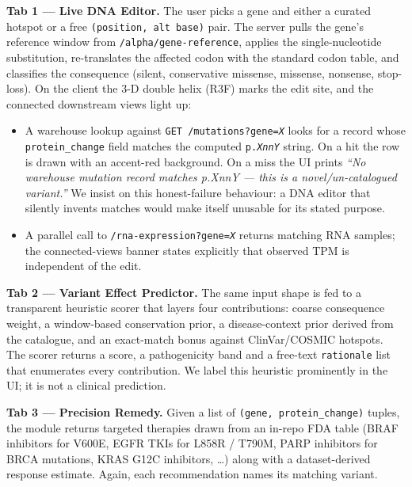 \documentclass[conference,10pt]{IEEEtran}
\begin{document}
\textbf{Tab 1 --- Live DNA Editor.} The user picks a gene and either a
curated hotspot or a free \texttt{(position, alt base)} pair. The server
pulls the gene's reference window from \texttt{/alpha/gene-reference},
applies the single-nucleotide substitution, re-translates the affected
codon with the standard codon table, and classifies the consequence
(silent, conservative missense, missense, nonsense, stop-loss). On the
client the 3-D double helix (R3F) marks the edit site, and the connected
downstream views light up:

\begin{itemize}
  \item A warehouse lookup against \texttt{GET /mutations?gene=\textit{X}}
        looks for a record whose \texttt{protein\_change} field matches
        the computed \texttt{p.\textit{XnnY}} string. On a hit the row
        is drawn with an accent-red background. On a miss the UI prints
        \textit{``No warehouse mutation record matches
        p.\textit{XnnY} --- this is a novel/un-catalogued
        variant.''} We insist on this honest-failure behaviour: a DNA
        editor that silently invents matches would make itself unusable
        for its stated purpose.
  \item A parallel call to \texttt{/rna-expression?gene=\textit{X}}
        returns matching RNA samples; the connected-views banner states
        explicitly that observed TPM is independent of the edit.
\end{itemize}

\textbf{Tab 2 --- Variant Effect Predictor.} The same input shape is fed
to a transparent heuristic scorer that layers four contributions:
coarse consequence weight, a window-based conservation prior, a
disease-context prior derived from the catalogue, and an exact-match
bonus against ClinVar/COSMIC hotspots. The scorer returns a score, a
pathogenicity band and a free-text \texttt{rationale} list that
enumerates every contribution. We label this heuristic prominently in
the UI; it is not a clinical prediction.

\textbf{Tab 3 --- Precision Remedy.} Given a list of
\texttt{(gene, protein\_change)} tuples, the module returns targeted
therapies drawn from an in-repo FDA table (BRAF inhibitors for V600E,
EGFR TKIs for L858R / T790M, PARP inhibitors for BRCA mutations, KRAS
G12C inhibitors, \dots) along with a dataset-derived response estimate.
Again, each recommendation names its matching variant.
\end{document}
